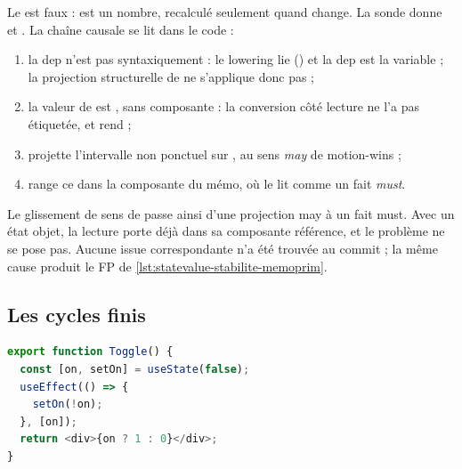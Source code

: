 Le \Warning{} est faux :  est un nombre, recalculé seulement
quand  change. La sonde donne  et
. La chaîne causale se lit dans le code :
\begin{enumerate}
  \item la dep  n'est pas syntaxiquement  : le
    lowering lie  ()
    et la dep est la variable  ; la projection structurelle de
     ne s'applique donc pas ;
  \item la valeur de  est , sans composante
     : la conversion côté lecture ne l'a pas étiquetée, et
     rend  ;
  \item {} projette l'intervalle non ponctuel sur
    , au sens \emph{may} de motion-wins ;
  \item {} range ce  dans la composante
     du mémo, où  le lit
    comme un fait \emph{must}.
\end{enumerate}
Le glissement de sens de  passe ainsi d'une projection may à
un fait must. Avec un état objet, la lecture porte déjà  dans
sa composante référence, et le problème ne se pose pas. Aucune issue
correspondante n'a été trouvée au commit \snapshotCommit{} ; la même cause
produit le FP de \cref{lst:statevalue-stabilite-memoprim}.

\subsection{Les cycles finis}

\begin{lstlisting}[language=TypeScript,caption={Un booléen qui bascule (\file{/tmp/ch10/kinds.tsx}, extrait)},label={lst:statevalue-stabilite-toggle}]
export function Toggle() {
  const [on, setOn] = useState(false);
  useEffect(() => {
    setOn(!on);
  }, [on]);
  return <div>{on ? 1 : 0}</div>;
}
\end{lstlisting}

